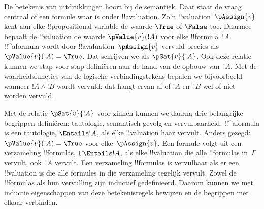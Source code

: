 \documentclass[../../../include/open-logic-section]{subfiles}
\begin{document}
De betekenis van uitdrukkingen hoort bij de semantiek. Daar staat de
vraag centraal of een formule waar is onder !!a{valuation}. Zo'n
!!{valuation}~$\pAssign{v}$ kent aan elke !!{propositional variable}
  de waarde $\True$ of $\False$ toe. Daarmee bepaalt de !!{valuation}
  de waarde $\pValue{v}(!A)$ voor elke !!{formula}~$!A$. !!^a{formula}
wordt door !!a{valuation}~$\pAssign{v}$ vervuld precies als
$\pValue{v}(!A) = \True$. Dat schrijven we als $\pSat{v}{!A}$. Ook
deze relatie kunnen we stap voor stap definiëren aan de hand van de
opbouw van~$!A$. Met de waarheidsfuncties van de logische
verbindingstekens bepalen we bijvoorbeeld wanneer $!A \land !B$ wordt
vervuld: dat hangt ervan af of $!A$ en~$!B$ wel of niet worden
vervuld.

Met de relatie $\pSat{v}{!A}$ voor zinnen kunnen we daarna drie
belangrijke begrippen definiëren: tautologie, semantisch gevolg en
vervulbaarheid. !!^a{formula} is een tautologie, $\Entails !A$, als
  elke !!{valuation} haar vervult. Anders gezegd:
  $\pValue{v}(!A) = \True$ voor elke~$\pAssign{v}$. Een formule volgt uit een
verzameling !!{formula}s, $\Gamma \Entails !A$, als elke
!!{valuation} die alle !!{formula}s in~$\Gamma$ vervult, ook~$!A$
vervult. Een verzameling !!{formula}s is vervulbaar als er een
!!{valuation} is die alle formules in die verzameling tegelijk
vervult. Zowel de !!{formula}s als hun vervulling zijn inductief
gedefinieerd. Daarom kunnen we met inductie eigenschappen van deze
betekenisregels bewijzen en de begrippen met elkaar verbinden.
\end{document}
